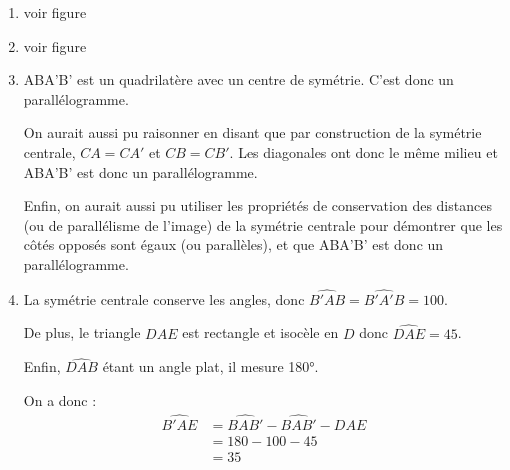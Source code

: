 \begin{enumerate}
    \item voir figure   
    \item voir figure  
\begin{figure}[H]
    \center
\end{figure}

    \item  {} ABA'B' est un quadrilatère avec un centre de symétrie. C'est donc un parallélogramme.
    
    On aurait aussi pu raisonner en disant que par construction de la symétrie centrale, $CA=CA'$ et $CB=CB'$. Les diagonales ont donc le même milieu et ABA'B' est donc un parallélogramme.

    Enfin, on aurait aussi pu utiliser les propriétés de conservation des distances (ou de parallélisme de l'image) de la symétrie centrale pour démontrer que les côtés opposés sont égaux (ou parallèles), et que ABA'B' est donc un parallélogramme.

    \item  {} 
    La symétrie centrale conserve les angles, donc $\widehat{B'AB}=\widehat{B'A'B}=100$.

    De plus, le triangle $DAE$ est rectangle et isocèle en $D$ donc $\widehat{DAE}=45$.

    Enfin, $\widehat{DAB}$ étant un angle plat, il mesure 180°.

    On a donc : \begin{align*}
    \widehat{B'AE}&=\widehat{BAB'}-\widehat{BAB'}-\widehat{DAE}\\
    &=180-100-45\\
    &=35
    \end{align*}
\end{enumerate}